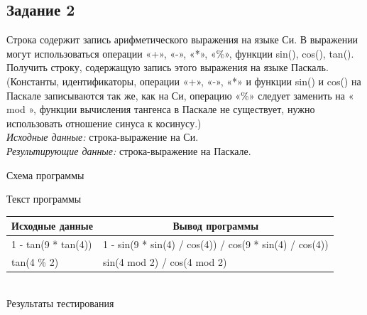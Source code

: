 \documentclass[a4paper,14pt]{extarticle}
\begin{document}
\subsection{Задание 2}
Строка содержит запись арифметического выражения на языке Си. В выражении могут использоваться операции «+», «-», «*», «\%», функции sin(), cos(), tan(). Получить строку, содержащую запись этого выражения на языке Паскаль. (Константы, идентификаторы, операции «+», «-», «*» и функции sin() и cos() на Паскале записываются так же, как на Си, операцию «\%» следует заменить на « mod », функции вычисления тангенса в Паскале не существует, нужно использовать отношение синуса к косинусу.)\\
\textit{Исходные данные:} строка-выражение на Си.\\
\textit{Результирующие данные:} строка-выражение на Паскале.\\
\begin{center}
Схема программы
\end{center}

\begin{center}
Текст программы\\
\vspace{0.6cm}
\begin{tabular}{|l|l|}
\hline
\multicolumn{1}{|c|}{Исходные данные}& \multicolumn{1}{|c|}{Вывод программы}\\
\hline
1 - tan(9 * tan(4)) & 1 - sin(9 * sin(4) / cos(4)) / cos(9 * sin(4) / cos(4)) \\
\hline
tan(4 \% 2) & sin(4 mod 2) / cos(4 mod 2) \\
\hline
\end{tabular}\\
\vspace{0.3cm}
Результаты тестирования
\end{center}
\end{document}
